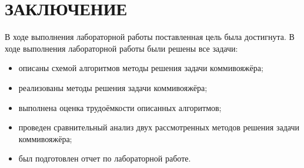 \section*{ЗАКЛЮЧЕНИЕ}

В ходе выполнения лабораторной работы поставленная цель была достигнута.
В ходе выполнения лабораторной работы были решены все задачи:
\begin{itemize}[label*=---]
	\item описаны схемой алгоритмов методы решения задачи коммивояжёра;
	\item реализованы методы решения задачи коммивояжёра;
	\item выполнена оценка трудоёмкости описанных алгоритмов; 
	\item проведен сравнительный анализ двух рассмотренных методов решения задачи коммивояжёра;
	\item был подготовлен отчет по лабораторной работе.
\end{itemize}

